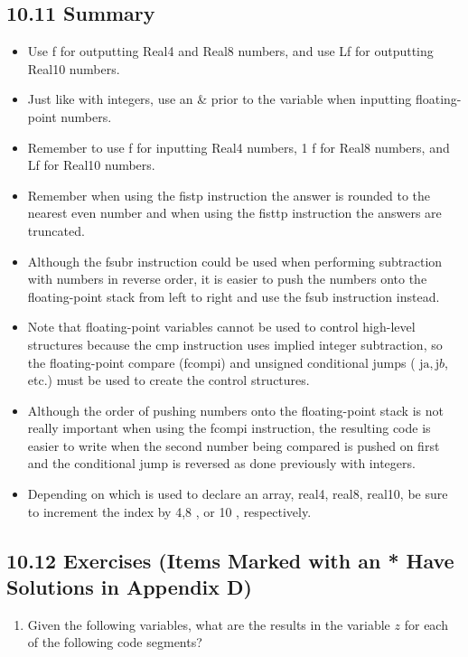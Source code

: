 \documentclass[10pt]{book}
\begin{document}
\subsection*{10.11 Summary}
\begin{itemize}
  \item Use f for outputting Real4 and Real8 numbers, and use Lf for outputting Real10 numbers.
  \item Just like with integers, use an \& prior to the variable when inputting floating-point numbers.
  \item Remember to use f for inputting Real4 numbers, 1 f for Real8 numbers, and Lf for Real10 numbers.
  \item Remember when using the fistp instruction the answer is rounded to the nearest even number and when using the fisttp instruction the answers are truncated.
  \item Although the fsubr instruction could be used when performing subtraction with numbers in reverse order, it is easier to push the numbers onto the floating-point stack from left to right and use the fsub instruction instead.
  \item Note that floating-point variables cannot be used to control high-level structures because the cmp instruction uses implied integer subtraction, so the floating-point compare (fcompi) and unsigned conditional jumps ( $\mathrm{ja}, \mathrm{j} b$, etc.) must be used to create the control structures.
  \item Although the order of pushing numbers onto the floating-point stack is not really important when using the fcompi instruction, the resulting code is easier to write when the second number being compared is pushed on first and the conditional jump is reversed as done previously with integers.
  \item Depending on which is used to declare an array, real4, real8, real10, be sure to increment the index by 4,8 , or 10 , respectively.
\end{itemize}

\subsection*{10.12 Exercises (Items Marked with an * Have Solutions in Appendix D)}
\begin{enumerate}
  \item Given the following variables, what are the results in the variable $z$ for each of the following code segments?
\end{enumerate}
\end{document}
